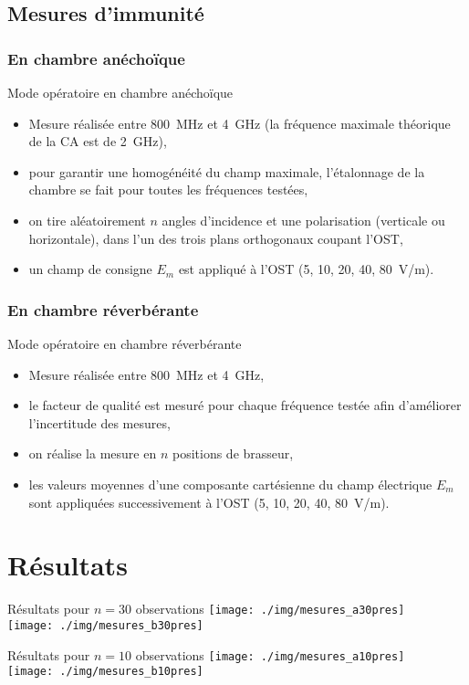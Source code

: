 \documentclass[]{beamer}
\begin{document}
\subsection{Mesures d'immunité}
\subsubsection{En chambre anéchoïque}
\begin{frame}{Mode opératoire en chambre anéchoïque}
\begin{itemize}
    \item Mesure réalisée entre 800~MHz et 4~GHz (la fréquence maximale théorique de la CA est de  2~GHz),
    \item pour garantir une homogénéité du champ maximale, l'étalonnage de la chambre se fait pour toutes les fréquences testées,
    \item on tire aléatoirement $n$ angles d'incidence et une polarisation (verticale ou horizontale), dans l'un des trois plans orthogonaux coupant l'OST,
    \item un champ de consigne $E_m$ est appliqué à l'OST (5, 10, 20, 40, 80~V/m).
\end{itemize}
\end{frame}
\subsubsection{En chambre réverbérante}
\begin{frame}{Mode opératoire en chambre réverbérante}
\begin{itemize}
    \item Mesure réalisée entre 800~MHz et 4~GHz,
    \item le facteur de qualité est mesuré pour chaque fréquence testée afin d'améliorer l'incertitude des mesures,
    \item on réalise la mesure en $n$ positions de brasseur,
 \item les valeurs moyennes d'une composante cartésienne du champ électrique $E_m$ sont appliquées successivement à l'OST (5, 10, 20, 40, 80~V/m).
\end{itemize}
\end{frame}
\section{Résultats}
\begin{frame}{Résultats pour $n=30$ observations}
     \centering 
\vspace{-0.1cm}
 \texttt{[image: ./img/mesures\_a30pres]} \\[-0.2cm]
 \texttt{[image: ./img/mesures\_b30pres]}
\end{frame}
\begin{frame}{Résultats pour $n=10$ observations}
 \centering 
\vspace{-0.1cm}
 \texttt{[image: ./img/mesures\_a10pres]} \\[-0.2cm]
 \texttt{[image: ./img/mesures\_b10pres]}
\end{frame}
\end{document}

